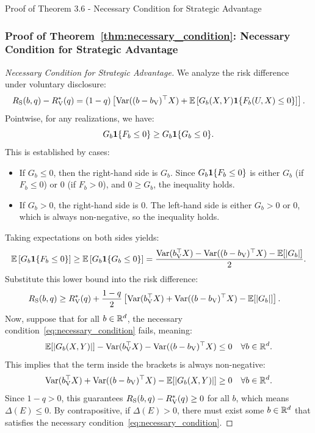 \begin{sourceblock}{Proof of Theorem 3.6 - Necessary Condition for Strategic Advantage}
\subsubsection*{Proof of Theorem~\ref{thm:necessary_condition}: Necessary Condition for Strategic Advantage}
\label{app:proof_necessary_condition}
\begin{proof}[Necessary Condition for Strategic Advantage]
We analyze the risk difference under voluntary disclosure:
\begin{equation}
    R_{\mathrm{S}}(b, q) - R_{\mathrm{V}}^*(q) = (1 - q) \left[ \mathrm{Var}((b - b_{\mathrm{V}})^\top X) + \mathbb{E}\left[ G_b(X, Y) \mathbf{1}\{F_b(U, X) \le 0\} \right] \right].
\end{equation}
Pointwise, for any realizations, we have:
\begin{equation}
    G_b \mathbf{1}\{F_b \le 0\} \ge G_b \mathbf{1}\{G_b \le 0\}.
\end{equation}
This is established by cases:
\begin{itemize}
    \item If $G_b \le 0$, then the right-hand side is $G_b$. Since $G_b \mathbf{1}\{F_b \le 0\}$ is either $G_b$ (if $F_b \le 0$) or $0$ (if $F_b > 0$), and $0 \ge G_b$, the inequality holds.
    \item If $G_b > 0$, the right-hand side is $0$. The left-hand side is either $G_b > 0$ or $0$, which is always non-negative, so the inequality holds.
\end{itemize}
Taking expectations on both sides yields:
\begin{equation}
    \mathbb{E}\left[ G_b \mathbf{1}\{F_b \le 0\} \right] \ge \mathbb{E}\left[ G_b \mathbf{1}\{G_b \le 0\} \right] = \frac{\mathrm{Var}(b_{\mathrm{V}}^\top X) - \mathrm{Var}((b - b_{\mathrm{V}})^\top X) - \mathbb{E}[|G_b|]}{2}.
\end{equation}
Substitute this lower bound into the risk difference:
\begin{align}
    R_{\mathrm{S}}(b, q) &\ge R_{\mathrm{V}}^*(q) + \frac{1 - q}{2} \left[ \mathrm{Var}(b_{\mathrm{V}}^\top X) + \mathrm{Var}((b - b_{\mathrm{V}})^\top X) - \mathbb{E}[|G_b|] \right].
\end{align}
Now, suppose that for all $b \in \mathbb{R}^d$, the necessary condition~\eqref{eq:necessary_condition} fails, meaning:
\begin{equation}
    \mathbb{E}[|G_b(X, Y)|] - \mathrm{Var}(b_{\mathrm{V}}^\top X) - \mathrm{Var}((b - b_{\mathrm{V}})^\top X) \le 0 \quad \forall b \in \mathbb{R}^d.
\end{equation}
This implies that the term inside the brackets is always non-negative:
\begin{equation}
    \mathrm{Var}(b_{\mathrm{V}}^\top X) + \mathrm{Var}((b - b_{\mathrm{V}})^\top X) - \mathbb{E}[|G_b(X, Y)|] \ge 0 \quad \forall b \in \mathbb{R}^d.
\end{equation}
Since $1 - q > 0$, this guarantees $R_{\mathrm{S}}(b, q) - R_{\mathrm{V}}^*(q) \ge 0$ for all $b$, which means $\Delta(E) \le 0$. By contrapositive, if $\Delta(E) > 0$, there must exist some $b \in \mathbb{R}^d$ that satisfies the necessary condition~\eqref{eq:necessary_condition}.
\end{proof}
\end{sourceblock}

